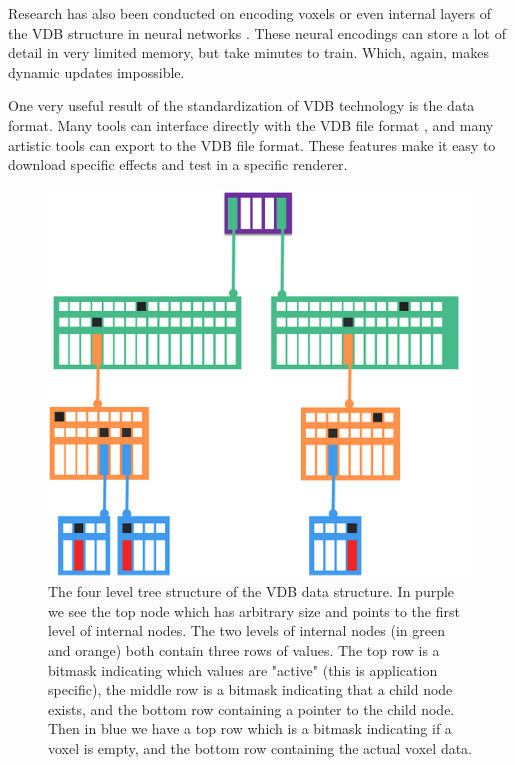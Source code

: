 Research has also been conducted on encoding voxels or even internal layers of the VDB structure in neural networks \cite{kim2022neuralvdb}. These neural encodings can store a lot of detail in very limited memory, but take minutes to train. Which, again, makes dynamic updates impossible.

One very useful result of the standardization of VDB technology is the data format. Many tools can interface directly with the VDB file format \cite{VDBADeepDive}, and many artistic tools can export to the VDB file format. These features make it easy to download specific effects and test in a specific renderer.

\begin{figure}
    \centering
    \includegraphics[width=\linewidth]{figures/OpenVDB.png}
    \caption{The four level tree structure of the VDB data structure. In purple we see the top node which has arbitrary size and points to the first level of internal nodes. The two levels of internal nodes (in green and orange) both contain three rows of values. The top row is a bitmask indicating which values are "active" (this is application specific), the middle row is a bitmask indicating that a child node exists, and the bottom row containing a pointer to the child node. Then in blue we have a top row which is a bitmask indicating if a voxel is empty, and the bottom row containing the actual voxel data. \cite{museth2013vdb}}
    \label{fig:VDB}
\end{figure}




